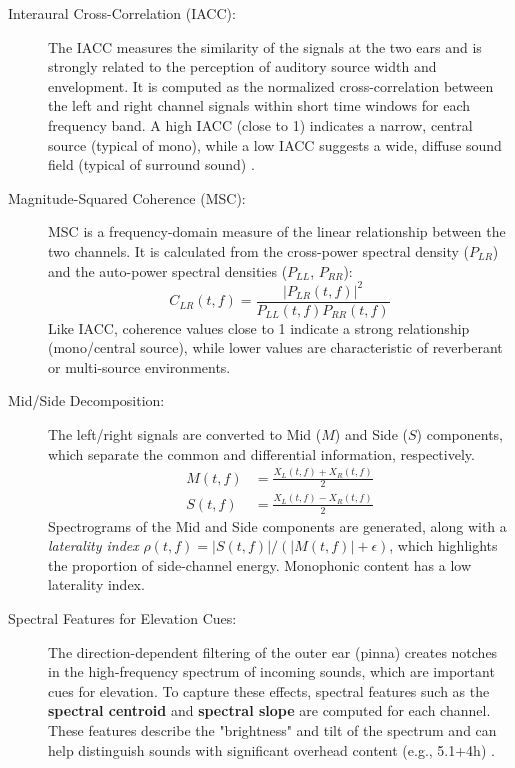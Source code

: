 \documentclass[12pt, a4paper]{article}
\begin{document}
\begin{description}
    \item[Interaural Cross-Correlation (IACC):] The IACC measures the similarity of the signals at the two ears and is strongly related to the perception of auditory source width and envelopment. It is computed as the normalized cross-correlation between the left and right channel signals within short time windows for each frequency band. A high IACC (close to 1) indicates a narrow, central source (typical of mono), while a low IACC suggests a wide, diffuse sound field (typical of surround sound) \cite{breebaart2001binaural}.
    
    \item[Magnitude-Squared Coherence (MSC):] MSC is a frequency-domain measure of the linear relationship between the two channels. It is calculated from the cross-power spectral density ($P_{LR}$) and the auto-power spectral densities ($P_{LL}$, $P_{RR}$):
    \begin{equation}
        C_{LR}(t, f) = \frac{|P_{LR}(t, f)|^2}{P_{LL}(t, f) P_{RR}(t, f)}
    \end{equation}
    Like IACC, coherence values close to 1 indicate a strong relationship (mono/central source), while lower values are characteristic of reverberant or multi-source environments.
    
    \item[Mid/Side Decomposition:] The left/right signals are converted to Mid ($M$) and Side ($S$) components, which separate the common and differential information, respectively.
    \begin{align}
        M(t, f) &= \frac{X_L(t, f) + X_R(t, f)}{2} \\
        S(t, f) &= \frac{X_L(t, f) - X_R(t, f)}{2}
    \end{align}
    Spectrograms of the Mid and Side components are generated, along with a \textit{laterality index} $\rho(t, f) = |S(t,f)| / (|M(t,f)| + \epsilon)$, which highlights the proportion of side-channel energy. Monophonic content has a low laterality index.
    
    \item[Spectral Features for Elevation Cues:] The direction-dependent filtering of the outer ear (pinna) creates notches in the high-frequency spectrum of incoming sounds, which are important cues for elevation. To capture these effects, spectral features such as the \textbf{spectral centroid} and \textbf{spectral slope} are computed for each channel. These features describe the "brightness" and tilt of the spectrum and can help distinguish sounds with significant overhead content (e.g., 5.1+4h) \cite{jehan2005creating}.
\end{description}
\end{document}
